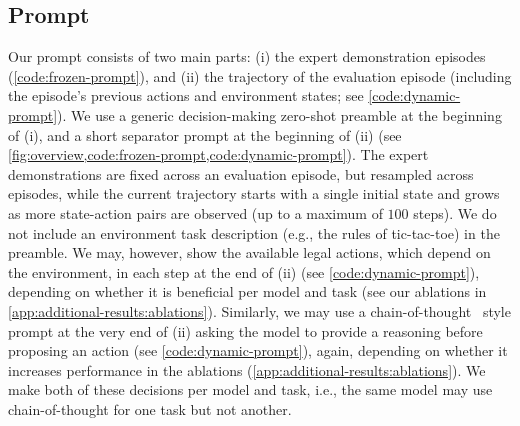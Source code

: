 \documentclass{article}
\newcommand{\eg}{e.g., }
\newcommand{\ie}{i.e., }
\begin{document}
\subsection{Prompt}
\label{sec:methods:prompt}
Our prompt consists of two main parts: (i) the expert demonstration episodes (\cref{code:frozen-prompt}), and (ii) the trajectory of the evaluation episode (including the episode's previous actions and environment states; see \cref{code:dynamic-prompt}).
We use a generic decision-making zero-shot preamble at the beginning of (i), and a short separator prompt at the beginning of (ii) (see \cref{fig:overview,code:frozen-prompt,code:dynamic-prompt}).
The expert demonstrations are fixed across an evaluation episode, but resampled across episodes, while the current trajectory starts with a single initial state and grows as more state-action pairs are observed (up to a maximum of $100$ steps).
We do not include an environment task description (\eg the rules of tic-tac-toe) in the preamble.
We may, however, show the available legal actions, which depend on the environment, in each step at the end of (ii) (see \cref{code:dynamic-prompt}), depending on whether it is beneficial per model and task (see our ablations in \cref{app:additional-results:ablations}).
Similarly, we may use a chain-of-thought~\citep{wei2022chain} style prompt at the very end of (ii) asking the model to provide a reasoning before proposing an action (see \cref{code:dynamic-prompt}), again, depending on whether it increases performance in the ablations (\cref{app:additional-results:ablations}).
We make both of these decisions per model and task, \ie the same model may use chain-of-thought for one task but not another.
\end{document}
